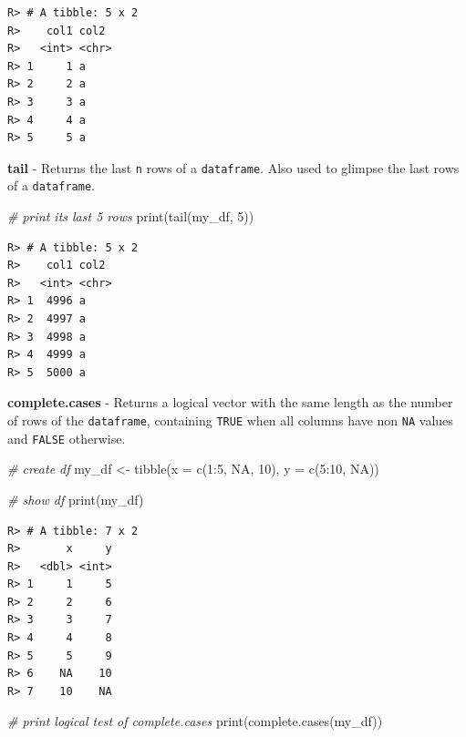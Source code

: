 \documentclass[
  12pt,
]{book}
\newenvironment{Shaded}{\begin{snugshade}}{\end{snugshade}}
\newcommand{\AttributeTok}[1]{\textcolor[rgb]{0.61,0.61,0.61}{#1}}
\newcommand{\CommentTok}[1]{\textcolor[rgb]{0.37,0.37,0.37}{\textit{#1}}}
\newcommand{\ConstantTok}[1]{\textcolor[rgb]{0,0,0}{#1}}
\newcommand{\DecValTok}[1]{\textcolor[rgb]{0.06,0.06,0.06}{#1}}
\newcommand{\FunctionTok}[1]{\textcolor[rgb]{0,0,0}{#1}}
\newcommand{\NormalTok}[1]{#1}
\newcommand{\OtherTok}[1]{\textcolor[rgb]{0.37,0.37,0.37}{#1}}
\newcommand{\SpecialCharTok}[1]{\textcolor[rgb]{0,0,0}{#1}}
\begin{document}
\begin{verbatim}
R> # A tibble: 5 x 2
R>    col1 col2 
R>   <int> <chr>
R> 1     1 a    
R> 2     2 a    
R> 3     3 a    
R> 4     4 a    
R> 5     5 a
\end{verbatim}

\textbf{tail} - Returns the last \texttt{n} rows of a \texttt{dataframe}. Also used to glimpse the last rows of a \texttt{dataframe}. 

\begin{Shaded}
\begin{Highlighting}[]
\CommentTok{\# print its last 5 rows}
\FunctionTok{print}\NormalTok{(}\FunctionTok{tail}\NormalTok{(my\_df, }\DecValTok{5}\NormalTok{))}
\end{Highlighting}
\end{Shaded}

\begin{verbatim}
R> # A tibble: 5 x 2
R>    col1 col2 
R>   <int> <chr>
R> 1  4996 a    
R> 2  4997 a    
R> 3  4998 a    
R> 4  4999 a    
R> 5  5000 a
\end{verbatim}

\textbf{complete.cases} - Returns a logical vector with the same length as the number of rows of the \texttt{dataframe}, containing \texttt{TRUE} when all columns have non \texttt{NA} values and \texttt{FALSE} otherwise. 

\begin{Shaded}
\begin{Highlighting}[]
\CommentTok{\# create df}
\NormalTok{my\_df }\OtherTok{\textless{}{-}} \FunctionTok{tibble}\NormalTok{(}\AttributeTok{x =} \FunctionTok{c}\NormalTok{(}\DecValTok{1}\SpecialCharTok{:}\DecValTok{5}\NormalTok{, }\ConstantTok{NA}\NormalTok{, }\DecValTok{10}\NormalTok{),}
                \AttributeTok{y =} \FunctionTok{c}\NormalTok{(}\DecValTok{5}\SpecialCharTok{:}\DecValTok{10}\NormalTok{, }\ConstantTok{NA}\NormalTok{))}

\CommentTok{\# show df}
\FunctionTok{print}\NormalTok{(my\_df)}
\end{Highlighting}
\end{Shaded}

\begin{verbatim}
R> # A tibble: 7 x 2
R>       x     y
R>   <dbl> <int>
R> 1     1     5
R> 2     2     6
R> 3     3     7
R> 4     4     8
R> 5     5     9
R> 6    NA    10
R> 7    10    NA
\end{verbatim}

\begin{Shaded}
\begin{Highlighting}[]
\CommentTok{\# print logical test of complete.cases}
\FunctionTok{print}\NormalTok{(}\FunctionTok{complete.cases}\NormalTok{(my\_df))}
\end{Highlighting}
\end{Shaded}
\end{document}

